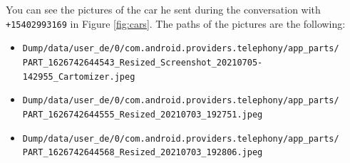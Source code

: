 \documentclass[12pt]{article}
\begin{document}
You can see the pictures of the car he sent during the conversation with \texttt{+15402993169} in Figure \ref{fig:cars}.
The paths of the pictures are the following:
\begin{itemize}
    \item \texttt{Dump/data/user\_de/0/com.android.providers.telephony/app\_parts/\\PART\_1626742644543\_Resized\_Screenshot\_20210705-142955\_Cartomizer.jpeg}
    \item \texttt{Dump/data/user\_de/0/com.android.providers.telephony/app\_parts/\\PART\_1626742644555\_Resized\_20210703\_192751.jpeg}
    \item \texttt{Dump/data/user\_de/0/com.android.providers.telephony/app\_parts/\\PART\_1626742644568\_Resized\_20210703\_192806.jpeg}
\end{itemize}
\end{document}
